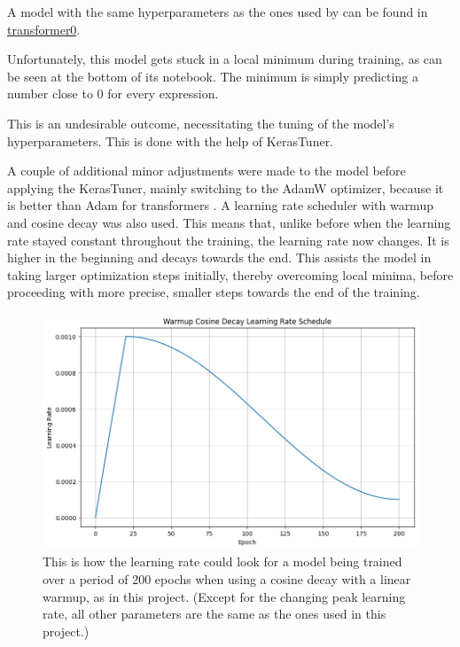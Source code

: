 \documentclass{article}
\begin{document}
A model with the same hyperparameters as the ones used by \cite{vaswani2023attentionneed} can be found in \href{https://github.com/AntonStantan/matura/blob/main/transformer/transformer0.ipynb}{transformer0}.

Unfortunately, this model gets stuck in a local minimum during training, as can be seen at the bottom of its notebook. The minimum is simply predicting a number close to 0 for every expression.

This is an undesirable outcome, necessitating the tuning of the model's hyperparameters. This is done with the help of KerasTuner.

A couple of additional minor adjustments were made to the model before applying the KerasTuner, mainly switching to the AdamW optimizer, because it is better than Adam for transformers \cite{loshchilov2019decoupledweightdecayregularization}. A learning rate scheduler with warmup and cosine decay was also used. This means that, unlike before when the learning rate stayed constant throughout the training, the learning rate now changes. It is higher in the beginning and decays towards the end. This assists the model in taking larger optimization steps initially, thereby overcoming local minima, before proceeding with more precise, smaller steps towards the end of the training.

\begin{figure}[htbp]
    \centering
    \includegraphics[width=0.5\paperwidth]{images/learningRate.png}
    \caption{This is how the learning rate could look for a model being trained over a period of 200 epochs when using a cosine decay with a linear warmup, as in this project. (Except for the changing peak learning rate, all other parameters are the same as the ones used in this project.)}
    \label{fig:learningrate}
\end{figure}
\end{document}
